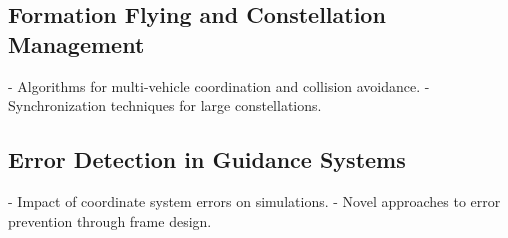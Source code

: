 \subsection{Formation Flying and Constellation Management}
- Algorithms for multi-vehicle coordination and collision avoidance.
- Synchronization techniques for large constellations.

\subsection{Error Detection in Guidance Systems}
- Impact of coordinate system errors on simulations.
- Novel approaches to error prevention through frame design.


\endinput  %
